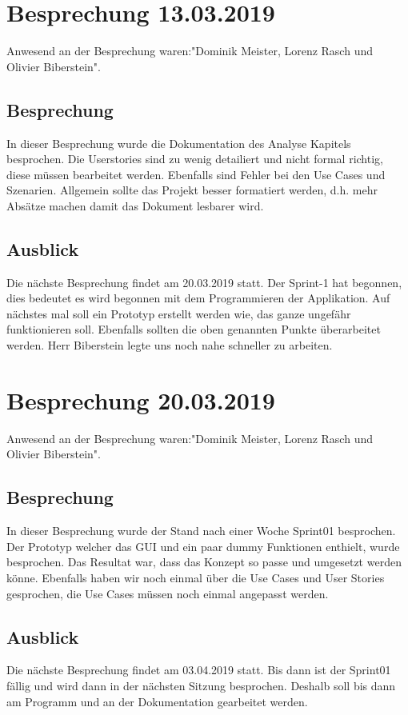 \documentclass[a4paper,parskip]{scrartcl}
\begin{document}
\section{Besprechung 13.03.2019}
Anwesend an der Besprechung waren:"Dominik Meister, Lorenz Rasch und Olivier Biberstein". 
\subsection{Besprechung}
In dieser Besprechung wurde die Dokumentation des Analyse Kapitels besprochen. Die Userstories sind zu wenig detailiert und nicht formal richtig, diese müssen bearbeitet werden. Ebenfalls sind Fehler bei den Use Cases und Szenarien. Allgemein sollte das Projekt besser formatiert werden, d.h. mehr Absätze machen damit das Dokument lesbarer wird.
\subsection{Ausblick}
Die nächste Besprechung findet am 20.03.2019 statt. Der Sprint-1 hat begonnen, dies bedeutet es wird begonnen mit dem Programmieren der Applikation. Auf nächstes mal soll ein Prototyp erstellt werden wie, das ganze ungefähr funktionieren soll. Ebenfalls sollten die oben genannten Punkte überarbeitet werden. Herr Biberstein legte uns noch nahe schneller zu arbeiten. 

\section{Besprechung 20.03.2019}
Anwesend an der Besprechung waren:"Dominik Meister, Lorenz Rasch und Olivier Biberstein". 
\subsection{Besprechung}
In dieser Besprechung wurde der Stand nach einer Woche Sprint01 besprochen. Der Prototyp welcher das GUI und ein paar dummy Funktionen enthielt, wurde 
besprochen. Das Resultat war, dass das Konzept so passe und umgesetzt werden könne. Ebenfalls haben wir noch einmal über die Use Cases und User Stories gesprochen, die Use Cases müssen noch einmal angepasst werden.
\subsection{Ausblick}
Die nächste Besprechung findet am 03.04.2019 statt. Bis dann ist der Sprint01 fällig und wird dann in der nächsten Sitzung besprochen. Deshalb soll bis
dann am Programm und an der Dokumentation gearbeitet werden. 
\end{document}
